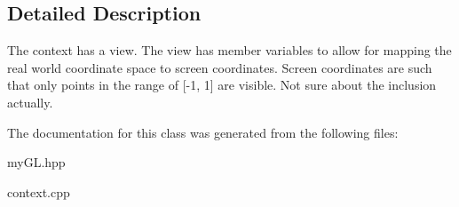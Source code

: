 \subsection{Detailed Description}
The context has a view. The view has member variables to allow for mapping the \textquotesingle{}real\textquotesingle{} world coordinate space to screen coordinates. Screen coordinates are such that only points in the range of \mbox{[}-\/1, 1\mbox{]} are visible. Not sure about the inclusion actually. 

The documentation for this class was generated from the following files\+:\begin{DoxyCompactItemize}
\item 
my\+G\+L.\+hpp\item 
context.\+cpp\end{DoxyCompactItemize}
